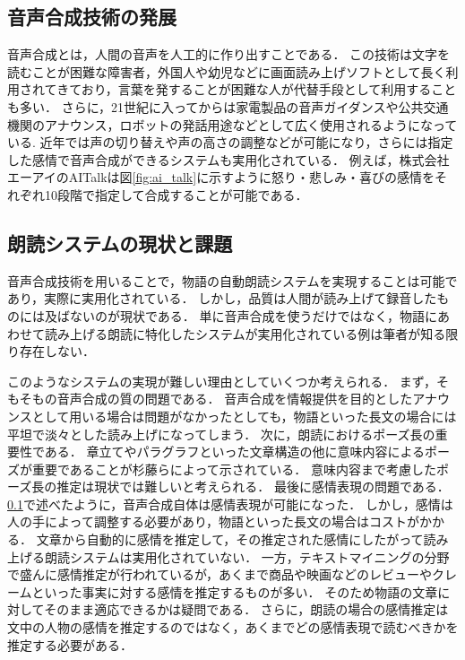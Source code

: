\subsection{音声合成技術の発展}\label{subsec:speech_synthesis}
音声合成とは，人間の音声を人工的に作り出すことである．
この技術は文字を読むことが困難な障害者，外国人や幼児などに画面読み上げソフトとして長く利用されてきており，言葉を発することが困難な人が代替手段として利用することも多い．
さらに，21世紀に入ってからは家電製品の音声ガイダンスや公共交通機関のアナウンス，ロボットの発話用途などとして広く使用されるようになっている.
近年では声の切り替えや声の高さの調整などが可能になり，さらには指定した感情で音声合成ができるシステムも実用化されている．
例えば，株式会社エーアイのAITalkは図\ref{fig:ai_talk}に示すように怒り・悲しみ・喜びの感情をそれぞれ10段階で指定して合成することが可能である．

\subsection{朗読システムの現状と課題}\label{subsec:reading_system}
音声合成技術を用いることで，物語の自動朗読システムを実現することは可能であり，実際に実用化されている．
しかし，品質は人間が読み上げて録音したものには及ばないのが現状である．
単に音声合成を使うだけではなく，物語にあわせて読み上げる朗読に特化したシステムが実用化されている例は筆者が知る限り存在しない．


このようなシステムの実現が難しい理由としていくつか考えられる．
まず，そもそもの音声合成の質の問題である．
音声合成を情報提供を目的としたアナウンスとして用いる場合は問題がなかったとしても，物語といった長文の場合には平坦で淡々とした読み上げになってしまう．
次に，朗読におけるポーズ長の重要性である．
章立てやパラグラフといった文章構造の他に意味内容によるポーズが重要であることが杉藤ら\cite{sugifuji}によって示されている．
意味内容まで考慮したポーズ長の推定は現状では難しいと考えられる．
最後に感情表現の問題である．
\ref{subsec:speech_synthesis}で述べたように，音声合成自体は感情表現が可能になった．
しかし，感情は人の手によって調整する必要があり，物語といった長文の場合はコストがかかる．
文章から自動的に感情を推定して，その推定された感情にしたがって読み上げる朗読システムは実用化されていない．
一方，テキストマイニングの分野で盛んに感情推定が行われているが，あくまで商品や映画などのレビューやクレームといった事実に対する感情を推定するものが多い．
そのため物語の文章に対してそのまま適応できるかは疑問である．
さらに，朗読の場合の感情推定は文中の人物の感情を推定するのではなく，あくまでどの感情表現で読むべきかを推定する必要がある．


